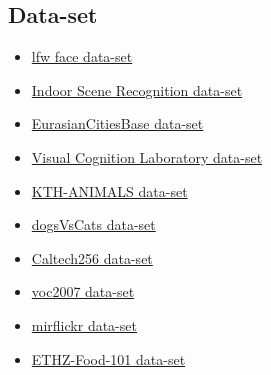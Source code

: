 \documentclass[a4paper,12pt]{report}
\begin{document}
      \subsection{Data-set}
      \begin{itemize}
        \item \href{http://vis-www.cs.umass.edu/lfw/}{lfw face data-set}
        \item \href{http://web.mit.edu/torralba/www/indoor.html}{Indoor Scene Recognition data-set}
        \item \href{https://graphics.cs.msu.ru/en/research/projects/msr/geometry}{EurasianCitiesBase data-set}
        \item \href{http://cvcl.mit.edu/database.htm}{Visual Cognition Laboratory data-set}
        \item \href{https://www.csc.kth.se/~heydarma/Datasets.html}{KTH-ANIMALS data-set} 
        \item \href{https://www.kaggle.com/c/dogs-vs-cats-redux-kernels-edition}{dogsVsCats data-set}
        \item \href{https://www.vision.caltech.edu/Image_Datasets/Caltech256/}{Caltech256 data-set}
        \item \href{http://host.robots.ox.ac.uk/pascal/VOC/voc2007/index.html}{voc2007 data-set}
        \item \href{http://press.liacs.nl/mirflickr/mirdownload.html}{mirflickr data-set}
        \item \href{https://www.vision.ee.ethz.ch/datasets_extra/food-101/}{ETHZ-Food-101 data-set}
      \end{itemize}
          
\end{document}
